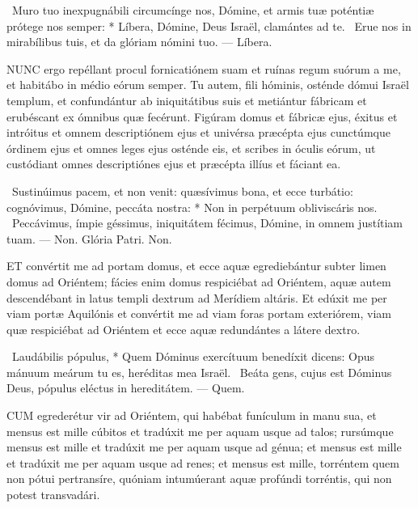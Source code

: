 \R\ Muro tuo inexpugnábili circumcínge nos, Dómine, et armis tuæ poténtiæ prótege nos semper: * Líbera, Dómine, Deus Israël, clamántes ad te. \V\ Erue nos in mirabílibus tuis, et da glóriam nómini tuo. — Líbera.



\lettrine[lines=2]{N}{UNC} ergo repéllant procul fornicatiónem suam et ruínas regum suórum a me, et habitábo in médio eórum semper. Tu autem, fili hóminis, osténde dómui Israël templum, et confundántur ab iniquitátibus suis et metiántur fábricam et erubéscant ex ómnibus quæ fecérunt. Figúram domus et fábricæ ejus, éxitus et intróitus et omnem descriptiónem ejus et univérsa præcépta ejus cunctúmque órdinem ejus et omnes leges ejus osténde eis, et scribes in óculis eórum, ut custódiant omnes descriptiónes ejus et præcépta illíus et fáciant ea.

\R\ Sustinúimus pacem, et non venit: quæsívimus bona, et ecce turbátio: cognóvimus, Dómine, peccáta nostra: * Non in perpétuum obliviscáris nos. \V\ Peccávimus, ímpie géssimus, iniquitátem fécimus, Dómine, in omnem justítiam tuam. — Non. Glória Patri. Non.




\lettrine[lines=2]{E}{T} convértit me ad portam domus, et ecce aquæ egrediebántur subter limen domus ad Oriéntem; fácies enim domus respiciébat ad Oriéntem, aquæ autem descendébant in latus templi dextrum ad Merídiem altáris. Et edúxit me per viam portæ Aquilónis et convértit me ad viam foras portam exteriórem, viam quæ respiciébat ad Oriéntem et ecce aquæ redundántes a látere dextro.

\R\ Laudábilis pópulus, * Quem Dóminus exercítuum benedíxit dicens: Opus mánuum meárum tu es, heréditas mea Israël. \V\ Beáta gens, cujus est Dóminus Deus, pópulus eléctus in hereditátem. — Quem.


\lettrine[lines=2]{C}{UM} egrederétur vir ad Oriéntem, qui habébat funículum in manu sua, et mensus est mille cúbitos et tradúxit me per aquam usque ad talos; rursúmque mensus est mille et tradúxit me per aquam usque ad génua; et mensus est mille et tradúxit me per aquam usque ad renes; et mensus est mille, torréntem quem non pótui pertransíre, quóniam intumúerant aquæ profúndi torréntis, qui non potest transvadári.

